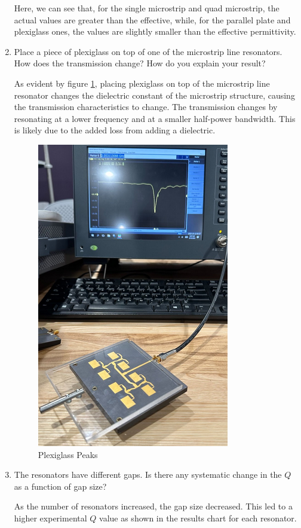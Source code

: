 \documentclass[
	letterpaper, %
	10pt, %
]{CSUniSchoolLabReport}
\begin{document}
\begin{enumerate}
  Here, we can see that, for the single microstrip and quad microstrip, the actual values are greater than the effective, while, for the parallel plate and plexiglass ones, the values are slightly smaller than the effective permittivity.

  \item Place a piece of plexiglass on top of one of the microstrip line resonators. How does the transmission change? How do you explain your result?

    As evident by figure \ref{fig:7}, placing plexiglass on top of the microstrip line resonator changes the dielectric constant of the microstrip structure, causing the transmission characteristics to change. The transmission changes by resonating at a lower frequency and at a smaller half-power bandwidth. This is likely due to the added loss from adding a dielectric.

    \begin{figure}[H]
      \centering
      \includegraphics[width=.6\textwidth]{Figures/Lab Three/Peaks-Plex.png}
      \caption{Plexiglass Peaks}
      \label{fig:7}
    \end{figure}

  \item The resonators have different gaps. Is there any systematic change in the $Q$ as a function of gap size?

As the number of resonators increased, the gap size decreased. This led to a higher experimental $Q$ value as shown in the results chart for each resonator. 


\end{enumerate}
\end{document}
